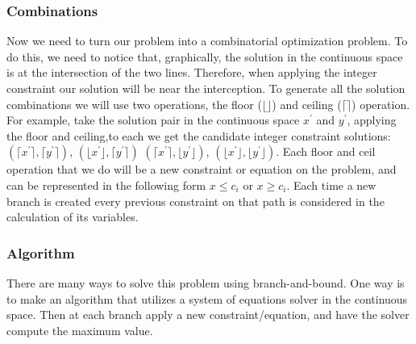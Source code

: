         \subsubsection{Combinations}
        Now we need to turn our problem into a combinatorial optimization problem.
        To do this, we need to notice that, graphically, the solution in the continuous space is at 
        the intersection of the two lines. Therefore, when applying the integer constraint our
        solution will be near the interception. To generate all the solution combinations we will 
        use two operations, the floor ($\lfloor \rfloor$) and ceiling ($\lceil \rceil$) operation. 
        For example, take the solution pair in the continuous space $x^{'}$ and $y^{'}$,
        applying the floor and ceiling,to each we get the candidate integer constraint solutions:  
        $(\lceil x^{'} \rceil, \lceil y^{'} \rceil)$, $(\lfloor x^{'} \rfloor, \lceil y^{'} \rceil)$
        $(\lceil x^{'} \rceil, \lfloor y^{'} \rfloor)$, $(\lfloor x^{'} \rfloor, \lfloor y^{'} \rfloor)$.
        Each floor and ceil operation that we do will be a new constraint or equation on the problem,
        and can be represented in the following form $x \leq c_i$ or $x \geq c_i$. 
        Each time a new branch is created every previous constraint on that path is 
        considered in the calculation of its variables.

        \subsubsection{Algorithm}
        There are many ways to solve this problem using branch-and-bound.
        One way is to make an algorithm that utilizes a system of equations solver in the continuous space.
        Then at each branch apply a new constraint/equation, and have the solver compute the maximum value.

        